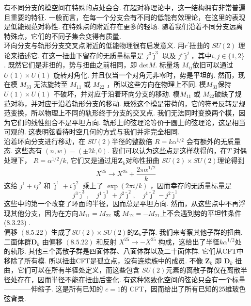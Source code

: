 有不同分支的模空间在特殊的点处会合. 在超对称理论中，这一结构拥有非常普遍且重要的特征. 一般而言，在每一个分支会有不同的低能有效理论，在这里的表现是低能规范对称性. 在特殊点的附近存在更多的轻场. 随着我们沿着不同分支远离特殊点，它们的不同子集会变得有质量.\\
环向分支与轨形分支交叉点附近的低能物理很有启发意义. 用$r^{\prime}$扭曲的 $S U(2)$ 理论来描述它. 在这一扭曲下留存的无质量标量是 $j^{3} \tilde{\jmath}^{3}$ 以及 $j^{i} \tilde{\jmath}^{j}$，其中$i, j \in\{1,2\} $ . 既然它们是非扭的，势与扭曲之前相同，即 $\mathrm{det} M$. 标量场 $M_{i j}$依旧可以通过 $U(1) \times U(1)$ 旋转对角化. 并且仅当一个对角元非零时，势是平坦的. 然而，现在模 $M_{33}$ 无法旋转至 $M_{11}$ 或 $M_{22}$ ，所以这些方向在物理上不同. 模$M_{33}$保持 $U(1) \times U(1)$ 不破坏，并对应于沿着环向分支的移动. 模$M_{11}$ 或 $M_{22}$破缺了规范对称，并对应于沿着轨形分支的移动. 既然这个模是带荷的，它的符号反转是规范变换，所以物理上不同的轨形终于分支的交叉点. 我们无法同时变换两个模，因为它们的线性组合不是平坦方向. 轨形上的弦理论等价于圆上的弦理论，这是相当可观的. 这表明弦看待时空几何的方式与我们并非完全相同.\\
沿着环向分支进行移动，在 $S U(2)$半径的整数倍 $R=k \alpha^{1 / 2} $ 会有额外的无质量态. 这些态有 $(n, w)=(\pm 2 k, 0)$. 我们可以认为这些点是这样获得的，在$T$ 对偶处理下， $R=\alpha^{1 / 2} / k$, 它们又是通过用$\mathbf{Z}_{k}$对称性扭曲 $S U(2) \times S U(2)$理论得到
\begin{equation}
	X^{25} \rightarrow X^{25}+\frac{2 \pi \alpha^{1 / 2}}{k}
\end{equation}
这给 $j^{1}+i j^{2}$ 和 $\tilde{\jmath}^{1}+i \tilde{\jmath}^{2}$ 乘上了 $\exp (2 \pi i / k)$ ，因而幸存的无质量标量是
\begin{equation}
	j^{3} \tilde{\jmath}^{3}, \quad j^{1} \tilde{\jmath}^{1}+j^{2} \tilde{\jmath}^{2}, \quad j^{1} \tilde{\jmath}^{2}-j^{2} \tilde{\jmath}^{1}
\end{equation}
这些中的第一个改变了环面的半径，因而总是平坦方向. 然而，从这些点中不再浮现其他分支，因为在方向$M_{11}=M_{22}$ 或 $M_{12}=-M_{21}$上不会遇到势的平坦性条件 (8.3.23) .\\
偏移 $(8.5 .22)$ 生成了$S U(2) \times S U(2) $的$\mathbf{Z}_{k}$子群. 我们来考察其他子群的扭曲. 二面体群$\mathbf{D}_{k}$ 由偏移 $(8.5 .22)$ 和反射 $X^{25} \rightarrow-X^{25}$ 构成，这给出了半径$k \alpha^{1 / 2}$处的轨形. 其他三个离散子群是四面体群、八面体群以及二十面体群. 它们从CFT中移除了所有模. 所以扭曲CFT是孤立点，没有连续族中的成员. 不像 $\mathbf{Z}_{k}$ 即 $\mathbf{D}_{k}$ 扭曲，它们可以在所有半径处定义，而这些包含 $S U(2)$元素的离散子群仅在离散半径处存在，因而半径不能在扭曲后变化. 有这种紧致化空间的弦论只会有一个标量————伸缩子. 
这是所有已知的 $c=1$的 CFT，因而给出了所有已知的25维玻色弦背景.


